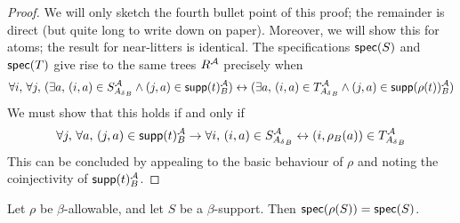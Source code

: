 \begin{proof}
  We will only sketch the fourth bullet point of this proof; the remainder is direct (but quite long to write down on paper).
  Moreover, we will show this for atoms; the result for near-litters is identical.
  The specifications \( \operatorname{\mathsf{spec}}(S) \) and \( \operatorname{\mathsf{spec}}(T) \) give rise to the same trees \( R^{\mathcal A} \) precisely when
  \[ \forall i,\, \forall j,\, (\exists a,\, (i, a) \in S_{{A_\delta}_B}^{\mathcal A} \wedge (j, a) \in \operatorname{\mathsf{supp}}(t)_B^{\mathcal A}) \leftrightarrow (\exists a,\, (i, a) \in T_{{A_\delta}_B}^{\mathcal A} \wedge (j, a) \in \operatorname{\mathsf{supp}}(\rho(t))_B^{\mathcal A}) \]
  We must show that this holds if and only if
  \[ \forall j,\, \forall a,\, (j, a) \in \operatorname{\mathsf{supp}}(t)_B^{\mathcal A} \to \forall i,\, (i, a) \in S_{{A_\delta}_B}^{\mathcal A} \leftrightarrow (i, \rho_B(a)) \in T_{{A_\delta}_B}^{\mathcal A} \]
  This can be concluded by appealing to the basic behaviour of \( \rho \) and noting the coinjectivity of \( \operatorname{\mathsf{supp}}(t)_B^{\mathcal A} \).
\end{proof}
\begin{proposition}
  Let \( \rho \) be \( \beta \)-allowable, and let \( S \) be a \( \beta \)-support.
  Then \( \operatorname{\mathsf{spec}}(\rho(S)) = \operatorname{\mathsf{spec}}(S) \).
\end{proposition}
